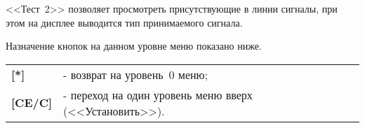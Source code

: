 <<Тест~2>> позволяет просмотреть присутствующие в линии сигналы, при этом на дисплее выводится тип принимаемого сигнала.

Назначение кнопок на данном уровне меню показано ниже.
\begin{center}
	\begin{tabular}{p{2cm} p{15cm}}
		\textbf{[*]} 			& - возврат на уровень~0 меню; \tabularnewline
		\textbf{[CE/C]} 		& - переход на один уровень меню вверх (<<Установить>>). \tabularnewline				
	\end{tabular}
\end{center} 
